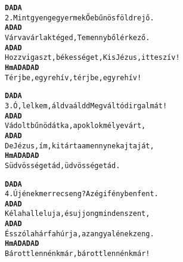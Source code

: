 \cleardoublepage
{}
\kottastart
{}
\kottaend
\begin{minipage}{\textwidth}
\begin{alltt}
\textbf{          D            A    D            A}
2. Mint gyenge gyermek Ő e bűnös földre jő.
\textbf{    A            D         A            D}
   Várva várlak téged, Te mennyből érkező.
\textbf{         A             D          A             D}
   Hozz vigaszt, békességet, Kis Jézus, itt e szív!
\textbf{    Hm      A      D A  D       A      D}
   Térj be, egyre hív, térj be, egyre hív!
\end{alltt}
\vspace{0.0cm}
\versszakspacing
\end{minipage}
\begin{minipage}{\textwidth}
\begin{alltt}
\textbf{       D            A        D           A}
3. Ó, lelkem, áldva áldd Megváltód irgalmát!
\textbf{    A           D        A            D}
   Vádolt bűnöd átka, a poklok mélye várt,
\textbf{       A            D       A            D}
   De Jézus, ím, kitárta a mennynek ajtaját,
\textbf{     Hm    A    D A D     A    D}
   S üdvösséget ád, üdvösséget ád.
\end{alltt}
\vspace{0.0cm}
\versszakspacing
\end{minipage}
\begin{minipage}{\textwidth}
\begin{alltt}
\textbf{      D            A       D            A}
4. Új ének merre cseng? Az égi fényben fent.
\textbf{    A          D       A               D}
   Kél a halleluja, és ujjong minden szent,
\textbf{        A           D        A           D}
   És szól a hárfa húrja, az angyalének zeng.
\textbf{    Hm      A       D A  D       A       D}
   Bár ott lennénk már, bár ott lennénk már!
\end{alltt}
\vspace{0.0cm}
\versszakspacing
\end{minipage}
~\vspace{1.0cm}
\newline

